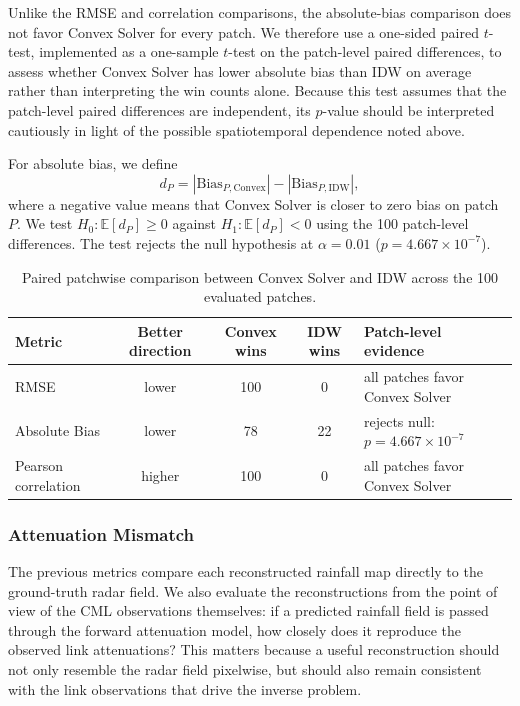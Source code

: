 \documentclass[11pt]{article}
\begin{document}
Unlike the RMSE and correlation comparisons, the absolute-bias comparison does not favor Convex Solver for every patch. We therefore use a one-sided paired $t$-test, implemented as a one-sample $t$-test on the patch-level paired differences, to assess whether Convex Solver has lower absolute bias than IDW on average rather than interpreting the win counts alone. Because this test assumes that the patch-level paired differences are independent, its $p$-value should be interpreted cautiously in light of the possible spatiotemporal dependence noted above.

For absolute bias, we define
\[
d_P = |\mathrm{Bias}_{P,\mathrm{Convex}}| - |\mathrm{Bias}_{P,\mathrm{IDW}}|,
\]
where a negative value means that Convex Solver is closer to zero bias on patch $P$. We test $H_0:\mathbb{E}[d_P]\geq 0$ against $H_1:\mathbb{E}[d_P]<0$ using the 100 patch-level differences. The test rejects the null hypothesis at $\alpha=0.01$ ($p=4.667\times10^{-7}$).

\begin{table}[H]
  \centering
  \small
  \setlength{\tabcolsep}{3.5pt}
  \begin{tabular}{lcccp{}}
    \toprule
    Metric & Better direction & Convex wins & IDW wins & Patch-level evidence \\
    \midrule
    RMSE & lower & 100 & 0 & all patches favor Convex Solver \\
    Absolute Bias & lower & 78 & 22 & rejects null: $p=4.667\times10^{-7}$ \\
    Pearson correlation & higher & 100 & 0 & all patches favor Convex Solver \\
    \bottomrule
  \end{tabular}
  \caption{Paired patchwise comparison between Convex Solver and IDW across the 100 evaluated patches.}
  \label{tab:convex_idw_paired_global}
\end{table}
\endgroup

\subsubsection{Attenuation Mismatch}
The previous metrics compare each reconstructed rainfall map directly to the ground-truth radar field. We also evaluate the reconstructions from the point of view of the CML observations themselves: if a predicted rainfall field is passed through the forward attenuation model, how closely does it reproduce the observed link attenuations? This matters because a useful reconstruction should not only resemble the radar field pixelwise, but should also remain consistent with the link observations that drive the inverse problem.
\end{document}
